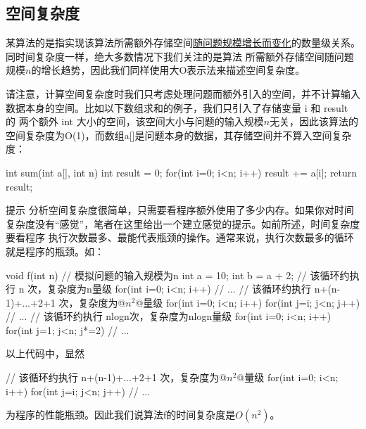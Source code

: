\subsection{空间复杂度}
某算法的是指实现该算法所需额外存储空间\uline{随问题规模增长而变化}的数量级关系。同时间复杂度一样，绝大多数情况下我们关注的是算法
所需额外存储空间随问题规模\(n\)的增长趋势，因此我们同样使用大O表示法来描述空间复杂度。

请注意，计算空间复杂度时我们只考虑处理问题而额外引入的空间，并不计算输入数据本身的空间。比如以下数组求和的例子，我们只引入了存储变量 i 和 result 的
两个额外 int 大小的空间，该空间大小与问题的输入规模\(n\)无关，因此该算法的空间复杂度为O(1)，而数组a[]是问题本身的数据，其存储空间并不算入空间复杂度：
\begin{cppcode}
int sum(int a[], int n)
{
    int result = 0;
    for(int i=0; i<n; i++)
    {
        result += a[i];
    }
    return result;
}
\end{cppcode}

\begin{notebox}{提示}
    分析空间复杂度很简单，只需要看程序额外使用了多少内存。如果你对时间复杂度没有“感觉”，笔者在这里给出一个建立感觉的提示。如前所述，时间复杂度要看程序
    执行次数最多、最能代表瓶颈的操作。通常来说，执行次数最多的循环就是程序的瓶颈。如：
    \begin{cppcode}
        void f(int n) { // 模拟问题的输入规模为n
            int a = 10;
            int b = a + 2;
            // 该循环约执行 n 次，复杂度为n量级
            for(int i=0; i<n; i++) {
                // ...
            }
            // 该循环约执行 n+(n-1)+...+2+1 次，复杂度为@\(n^2\)@量级
            for(int i=0; i<n; i++) {
                for(int j=i; j<n; j++) {
                    // ...
                }
            }
            // 该循环约执行 nlogn次，复杂度为nlogn量级
            for(int i=0; i<n; i++) {
                for(int j=1; j<n; j*=2) {
                    // ...
                }
            }
        }
    \end{cppcode}
    以上代码中，显然
    \begin{cppcode}
        // 该循环约执行 n+(n-1)+...+2+1 次，复杂度为@\(n^2\)@量级
        for(int i=0; i<n; i++) {
            for(int j=i; j<n; j++) {
                // ...
            }
        }
    \end{cppcode}
    为程序的性能瓶颈。因此我们说算法f的时间复杂度是\(O(n^2)\)。
\end{notebox}

